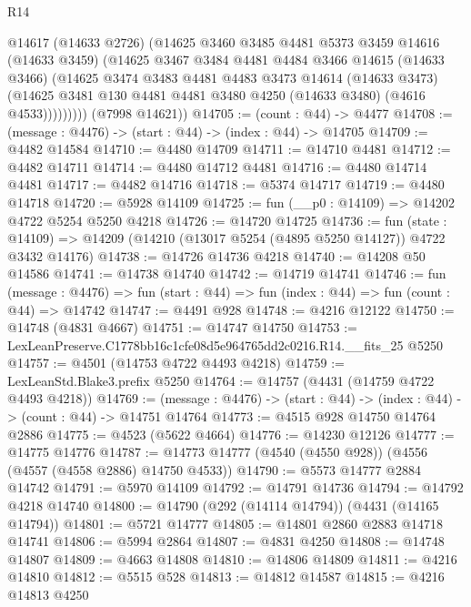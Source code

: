 \begin{lexlean}{R14}
\begin{coremodule}
              @14617
              (@14633 @2726)
              (@14625
                @3460
                @3485
                @4481
                @5373
                @3459
                @14616
                (@14633 @3459)
                (@14625
                  @3467
                  @3484
                  @4481
                  @4484
                  @3466
                  @14615
                  (@14633 @3466)
                  (@14625
                    @3474
                    @3483
                    @4481
                    @4483
                    @3473
                    @14614
                    (@14633 @3473)
                    (@14625 @3481 @130 @4481 @4481 @3480 @4250 (@14633 @3480) (@4616 @4533)))))))))
      (@7998 @14621))
@14705 := (count : @44) -> @4477
@14708 := (message : @4476) -> (start : @44) -> (index : @44) -> @14705
@14709 := @4482 @14584
@14710 := @4480 @14709
@14711 := @14710 @4481
@14712 := @4482 @14711
@14714 := @4480 @14712 @4481
@14716 := @4480 @14714 @4481
@14717 := @4482 @14716
@14718 := @5374 @14717
@14719 := @4480 @14718
@14720 := @5928 @14109
@14725 := fun (__p0 : @14109) => @14202 @4722 @5254 @5250 @4218
@14726 := @14720 @14725
@14736 := fun (state : @14109) =>
  @14209 (@14210 (@13017 @5254 (@4895 @5250 @14127)) @4722 @3432 @14176)
@14738 := @14726 @14736 @4218
@14740 := @14208 @50 @14586
@14741 := @14738 @14740
@14742 := @14719 @14741
@14746 := fun (message : @4476) =>
  fun (start : @44) => fun (index : @44) => fun (count : @44) => @14742
@14747 := @4491 @928
@14748 := @4216 @12122
@14750 := @14748 (@4831 @4667)
@14751 := @14747 @14750
@14753 := LexLeanPreserve.C1778bb16c1cfe08d5e964765dd2c0216.R14.__fits_25 @5250
@14757 := @4501 (@14753 @4722 @4493 @4218)
@14759 := LexLeanStd.Blake3.prefix @5250
@14764 := @14757 (@4431 (@14759 @4722 @4493 @4218))
@14769 := (message : @4476) -> (start : @44) -> (index : @44) -> (count : @44) -> @14751 @14764
@14773 := @4515 @928 @14750 @14764 @2886
@14775 := @4523 (@5622 @4664)
@14776 := @14230 @12126
@14777 := @14775 @14776
@14787 := @14773 @14777 (@4540 (@4550 @928)) (@4556 (@4557 (@4558 @2886) @14750 @4533))
@14790 := @5573 @14777 @2884 @14742
@14791 := @5970 @14109
@14792 := @14791 @14736
@14794 := @14792 @4218 @14740
@14800 := @14790 (@292 (@14114 @14794)) (@4431 (@14165 @14794))
@14801 := @5721 @14777
@14805 := @14801 @2860 @2883 @14718 @14741
@14806 := @5994 @2864
@14807 := @4831 @4250
@14808 := @14748 @14807
@14809 := @4663 @14808
@14810 := @14806 @14809
@14811 := @4216 @14810
@14812 := @5515 @528
@14813 := @14812 @14587
@14815 := @4216 @14813 @4250

\end{coremodule}
\end{lexlean}
